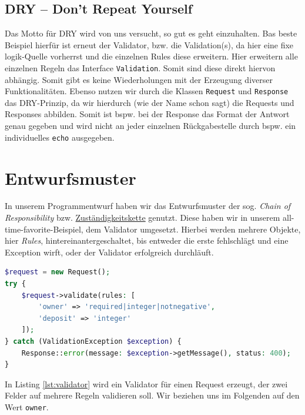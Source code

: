 \documentclass[12pt,a4paper,titlepage,ngerman,pdftex]{report}
\begin{document}
    \subsection{DRY -- Don't Repeat Yourself}
    \label{subsec:dry}
    Das Motto für DRY wird von uns versucht, so gut es geht einzuhalten.
    Bas beste Beispiel hierfür ist erneut der Validator, bzw. die Validation(s), da hier eine fixe logik-Quelle vorherrst und die einzelnen Rules diese erweitern.
    Hier erweitern alle einzelnen Regeln das Interface \verb|Validation|.
    Somit sind diese direkt hiervon abhängig.
    Somit gibt es keine Wiederholungen mit der Erzeugung diverser Funktionalitäten.
    Ebenso nutzen wir durch die Klassen \verb|Request| und \verb|Response| das DRY-Prinzip, da wir hierdurch (wie der Name schon sagt) die Requests und Responses abbilden.
    Somit ist bspw. bei der Response das Format der Antwort genau gegeben und wird nicht an jeder einzelnen Rückgabestelle durch bspw. ein individuelles \verb|echo| ausgegeben.

    \section{Entwurfsmuster}\label{sec:Entwurfsmuster}
    In unserem Programmentwurf haben wir das Entwurfsmuster der sog. \textit{Chain of Responsibility} bzw. \href{https://de.wikipedia.org/wiki/Zust%C3%A4ndigkeitskette}{Zuständigkeitskette} genutzt.
    Diese haben wir in unserem all-time-favorite-Beispiel, dem Validator umgesetzt.
    Hierbei werden mehrere Objekte, hier \textit{Rules}, hintereinantergeschaltet, bis entweder die erste fehlschlägt und eine Exception wirft, oder der Validator erfolgreich durchläuft.

    \begin{lstlisting}[language=php,label={lst:validator},escapechar=\%,caption={Beispiel Zuständigkeitskette - Code-Ausschnitt aus AccountController.php}]
$request = new Request();
try {
    $request->validate(rules: [
        'owner' => 'required|integer|notnegative',
        'deposit' => 'integer'
    ]);
} catch (ValidationException $exception) {
    Response::error(message: $exception->getMessage(), status: 400);
}
    \end{lstlisting}

    In Listing \ref{lst:validator} wird ein Validator für einen Request erzeugt, der zwei Felder auf mehrere Regeln validieren soll.
    Wir beziehen uns im Folgenden auf den Wert \verb|owner|.
\end{document}
